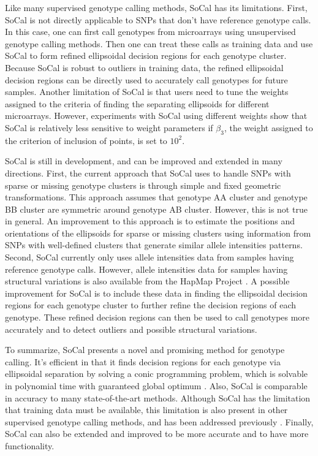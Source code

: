 \documentclass{scrartcl}
\begin{document}
\par
Like many supervised genotype calling methods, SoCal has its limitations.
First, SoCal is not directly applicable to SNPs that don't have
reference genotype calls.
In this case, one can first call genotypes from microarrays using
unsupervised genotype calling methods.
Then one can treat these calls as training data and use SoCal to
form refined ellipsoidal decision regions for each genotype cluster.
Because SoCal is robust to outliers in training data, the refined
ellipsoidal decision regions can be directly used to accurately call genotypes
for future samples.
Another limitation of SoCal is that users need to tune the weights
assigned to the criteria of finding the separating ellipsoids
for different microarrays.
However, experiments with SoCal using different weights show that SoCal is
relatively less sensitive to weight parameters if $\beta_3$, the weight
assigned to the criterion of inclusion of points, is set to $10^2$.

\par
SoCal is still in development, and can be improved and extended in
many directions.
First, the current approach that SoCal uses to handle SNPs with sparse or
missing genotype clusters is through simple and fixed geometric
transformations.
This approach assumes that genotype AA cluster and genotype BB cluster are
symmetric around genotype AB cluster.
However, this is not true in general.
An improvement to this approach is to estimate the positions and orientations
of the ellipsoids for sparse or missing clusters using information from
SNPs with well-defined clusters that generate similar allele
intensities patterns. 
Second, SoCal currently only uses allele intensities data from samples having
reference genotype calls.
However, allele intensities data for samples having structural variations is
also available from the HapMap Project \cite{hapmap2003}.
A possible improvement for SoCal is to include these data in finding the
ellipsoidal decision regions for each genotype cluster to further refine the
decision regions of each genotype.
These refined decision regions can then be used to call genotypes more
accurately and to detect outliers and possible structural variations.

\par
To summarize, SoCal presents a novel and promising method for genotype calling.
It's efficient in that it finds decision regions for each genotype via
ellipsoidal separation by solving a conic programming problem, which is
solvable in polynomial time with guaranteed global optimum \cite{glineur1998}.
Also, SoCal is comparable in accuracy to many state-of-the-art methods.
Although SoCal has the limitation that training data must be available, this
limitation is also present in other supervised genotype calling methods, and
has been addressed previously \cite{carvalho2007}.
Finally, SoCal can also be extended and improved to be more accurate and to
have more functionality.
\end{document}
